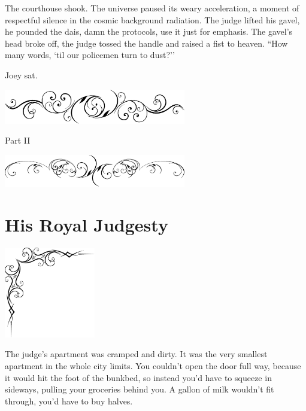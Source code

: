 \documentclass[oneside]{book}
\begin{document}
The courthouse shook.
The universe paused its weary
acceleration, a moment of respectful silence in the cosmic background radiation.
The judge lifted his gavel, he pounded the dais,
damn the protocols, use it just for emphasis.  The gavel's head broke off,
the judge tossed the handle and raised a fist to heaven.
``How many words, `til our policemen turn to dust?''

Joey sat.

\clearpage

\thispagestyle{empty}

{
\center
\includegraphics[width=300px]{yydiv.eps}
\par
}

\vspace{.1in}

{
\center
\Huge
Part II
\par
}

\vspace{.25in}
{
\center
\includegraphics[width=300px]{slashdiv.eps}
\par
}


\chapter{His Royal Judgesty}

\vspace{-2in}
\hspace{-.5in}
\includegraphics[width=150px]{ulcorner1.eps}

The judge's apartment was cramped and dirty.
It was the very smallest apartment in the whole city limits.
You couldn't open the door full way, because it would hit
the foot of the bunkbed, so instead you'd have to squeeze in
sideways, pulling your groceries behind you.
A gallon of milk wouldn't fit through, you'd have
to buy halves.
\end{document}
